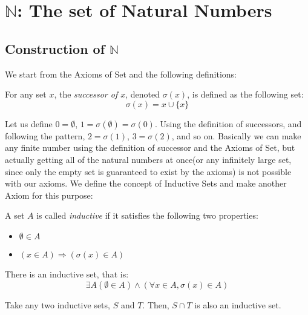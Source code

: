 \documentclass{report}
\begin{document}
	\section{$\mathbb{N}$: The set of Natural Numbers}
		\subsection{Construction of $\mathbb{N}$}
		We start from the Axioms of Set and the following definitions:
		
		\begin{defn}[Successor] \label{defn_successor}
			For any set $x$, the \emph{successor of $x$}, denoted $\sigma(x)$, is defined as the following set:
			\begin{displaymath}
			\sigma(x)=x \cup \{x\}
			\end{displaymath}
		\end{defn}
		
		Let us define $0=\emptyset$, $1=\sigma(\emptyset)=\sigma(0)$. Using the definition of successors, and following the pattern, $2=\sigma(1)$, $3=\sigma(2)$, and so on. Basically we can make any finite number using the definition of successor and the Axioms of Set, but actually getting all of the natural numbers at once(or any infinitely large set, since only the empty set is guaranteed to exist by the axioms) is not possible with our axioms. We define the concept of Inductive Sets and make another Axiom for this purpose:
		
		\begin{defn} \label{defn_inductive_set}
			A set $A$ is called \emph{inductive} if it satisfies the following two properties:
			\begin{itemize}
				\item $\emptyset \in A$
				\item $(x \in A) \Rightarrow (\sigma(x) \in A)$
			\end{itemize}
		\end{defn}
		
		\begin{axiom} \label{axiom_infinity}
			There is an inductive set, that is:
			\begin{displaymath}
			\exists A (\emptyset \in A) \wedge (\forall x \in A, \sigma(x) \in A)
			\end{displaymath}
		\end{axiom}
		
		\begin{thm}
			Take any two inductive sets, $S$ and $T$. Then, $S \cap T$ is also an inductive set.
		\end{thm}
		
\end{document}
